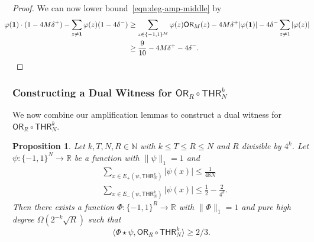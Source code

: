 \documentclass[11pt, letterpaper, fleqn]{article}
\newtheorem{proposition}[theorem]{Proposition}
\theoremstyle{plain}
\newcommand{\R}{\mathbb{R}}
\newcommand{\OR}{\mathsf{ OR}}
\newcommand{\THR}{\mathsf{THR}}
\newcommand{\bits}{\{-1,1\}}
\newcommand{\ls}{\star}
\newcommand{\N}{\mathbb{N}}
\begin{document}
\begin{proof}
We can now lower bound~\eqref{eqn:deg-amp-middle} by
\begin{align*}\hspace{-1.1em}
\varphi(\mathbf{1}) \cdot (1 - 4 M \delta^+) - \sum_{z \ne \mathbf{1}} \varphi(z) (1 - 4\delta^-) &\ge \sum_{z \in \bits^M} \varphi(z) \OR_M(z) - 4M\delta^+ |\varphi(\mathbf{1})| - 4\delta^- \sum_{z \ne 1} |\varphi(z)| \\
&\ge \frac{9}{10} - 4M\delta^+ - 4\delta^-.\qedhere
\end{align*}
\end{proof}



\subsubsection{Constructing a Dual Witness for $\OR_R \circ \THR^k_N$}

We now combine our amplification lemmas to construct a dual witness for $\OR_R \circ \THR^k_N$.

\begin{proposition} \label{prop:dist-prelim}
Let $k, T, N, R \in \N$ with $k \le T \le R \le N$ and $R$ divisible by $4^k$. Let $\psi : \bits^N \to \R$ be a function with $\|\psi\|_1 = 1$ and
\begin{align*}
&\sum_{x \in E_+(\psi, \THR^k_N)} |\psi(x)| \le \frac{1}{48 N} \\
&\sum_{x \in E_-(\psi, \THR^k_N)} |\psi(x)| \le \frac{1}{2} - \frac{2}{4^k}. 
\end{align*}
Then there exists a function $\Phi : \bits^R \to \R$ with $\|\Phi\|_1 = 1$ and pure high degree $\Omega(2^{-k} \sqrt{R})$ such that
\[ \langle \Phi \ls \psi, \OR_R \circ \THR^k_N \rangle \ge 2/3. \]
\end{proposition}
\end{document}
